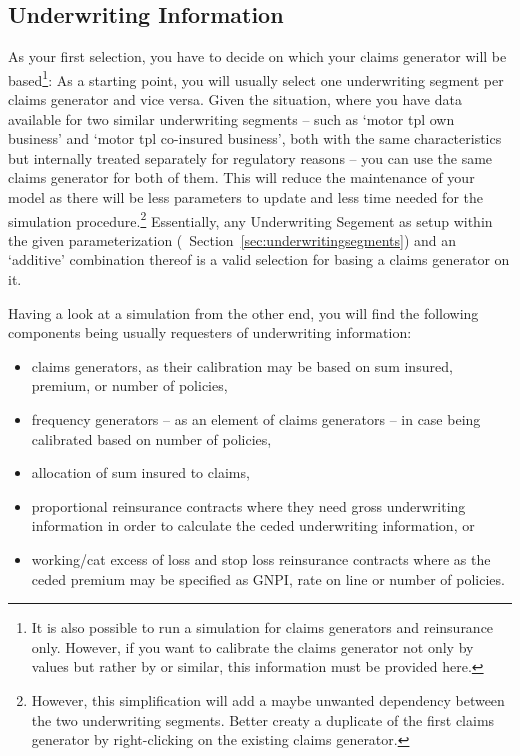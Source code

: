 \subsection{Underwriting Information}
\label{subsec:UWInfo} 
 
As your first selection, you have to decide on which  your claims generator will be based\footnote{It is also possible to run a simulation for claims generators and reinsurance only. However, if you want to calibrate the claims generator not only by  values but rather by  or similar, this information must be provided here.}: As a starting point, you will usually select one underwriting segment per claims generator and vice versa. Given the situation, where you have data available for two similar underwriting segments -- such as `motor tpl own business' and `motor tpl co-insured business', both with the same characteristics but internally treated separately for regulatory reasons -- you can use the same claims generator for both of them. This will reduce the maintenance of your model as there will be less parameters to update and less time needed for the simulation procedure.\footnote{However, this simplification will add a maybe unwanted dependency between the two underwriting segments. Better creaty a duplicate of the first claims generator by right-clicking on the existing claims generator.} Essentially, any Underwriting Segement as setup within the given parameterization (\cf~Section~\ref{sec:underwritingsegments}) and an `additive' combination thereof is a valid selection for basing a claims generator on it. 
 
Having a look at a simulation from the other end, you will find the following components being usually requesters of underwriting information:


\begin{itemize}
	\item claims generators, as their calibration may be based on sum insured, premium, or number of policies,
	\item frequency generators -- as an element of claims generators -- in case being calibrated based on number of policies,
	\item allocation of sum insured to claims,
	\item proportional reinsurance contracts where they need gross underwriting information in order to calculate the ceded underwriting information, or
	\item working/cat excess of loss and stop loss reinsurance contracts where as the ceded premium may be specified as GNPI, rate on line or number of policies.

\end{itemize}
 
